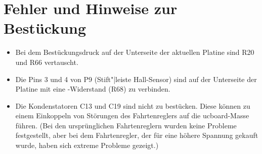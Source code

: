 \section{Fehler und Hinweise zur Bestückung}

\begin{itemize}
	\item Bei dem Bestückungsdruck auf der Unterseite der aktuellen Platine sind R20 und R66 vertauscht.
	\item Die Pins 3 und 4 von P9 (Stift"|leiste Hall-Sensor) sind auf der Unterseite der Platine mit eine -Widerstand (R68) zu verbinden.
	\item Die Kondenstatoren C13 und C19 sind nicht zu bestücken. Diese können zu einem Einkoppeln von Störungen des Fahrtenreglers auf die ucboard-Masse führen. (Bei den ursprünglichen Fahrtenreglern wurden keine Probleme festgestellt, aber bei dem Fahrtenregler, der für eine höhere Spannung gekauft wurde, haben sich extreme Probleme gezeigt.)
\end{itemize}

